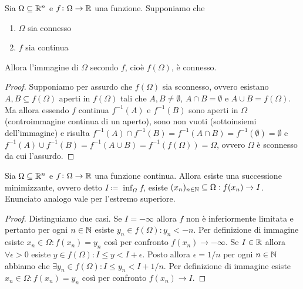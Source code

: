 \begin{thm}
	Sia $ \Omega \subseteq \mathbb{R}^n $ e $ f \colon \Omega \to \mathbb{R} $ una funzione. Supponiamo che  
	\begin{enumerate}[label = (\roman*)]
		\item $ \Omega $ sia connesso
		\item $ f $ sia continua
	\end{enumerate}
	Allora l'immagine di $ \Omega $ secondo $ f $, cioè $ f(\Omega) $, è connesso.
\end{thm}
%
\begin{proof}
	Supponiamo per assurdo che $ f(\Omega) $ sia sconnesso, ovvero esistano $ A, B \subseteq f(\Omega) $ aperti in $ f(\Omega) $ tali che $ A, B \neq \emptyset $, $ A \cap B = \emptyset $ e $ A \cup B = f(\Omega) $. Ma allora essendo $ f $ continua $ f^{-1}(A) $ e $ f^{-1}(B) $ sono aperti in $ \Omega $ (controimmagine continua di un aperto), sono non vuoti (sottoinsiemi dell'immagine) e risulta $ f^{-1}(A) \cap f^{-1}(B) = f^{-1}(A \cap B) = f^{-1}(\emptyset) = \emptyset $ e $ f^{-1}(A) \cup f^{-1}(B) = f^{-1}(A \cup B) = f^{-1}(f(\Omega)) = \Omega $, ovvero $ \Omega $ è sconnesso da cui l'assurdo. 
\end{proof}

\begin{lemma} \label{lem:succminim}
	Sia $ \Omega \subseteq \mathbb{R}^n $ e $ f \colon \Omega \to \mathbb{R} $ una funzione continua. Allora esiste una successione minimizzante, ovvero detto $ I \coloneqq \inf_{\Omega}f $, esiste $ (x_n)_{n \in \mathbb{N}} \subseteq \Omega : f(x_n) \to I $. Enunciato analogo vale per l'estremo superiore.
\end{lemma}
%
\begin{proof}
	Distinguiamo due casi. Se $ I = -\infty $ allora $ f $ non è inferiormente limitata e pertanto per ogni $ n \in \mathbb{N} $ esiste $ y_n \in f(\Omega) : y_n < -n $. Per definizione di immagine esiste $ x_n \in \Omega : f(x_n) = y_n $ così per confronto $ f(x_n) \to -\infty $. Se $ I \in \mathbb{R} $ allora $ \forall \epsilon > 0 $ esiste $ y \in f(\Omega) : I \leq y < I + \epsilon $. Posto allora $ \epsilon = 1/n $ per ogni $ n \in \mathbb{N} $ abbiamo che $ \exists y_n \in f(\Omega) : I \leq y_n < I + 1/n $. Per definizione di immagine esiste $ x_n \in \Omega : f(x_n) = y_n $ così per confronto $ f(x_n) \to I $.
\end{proof}

